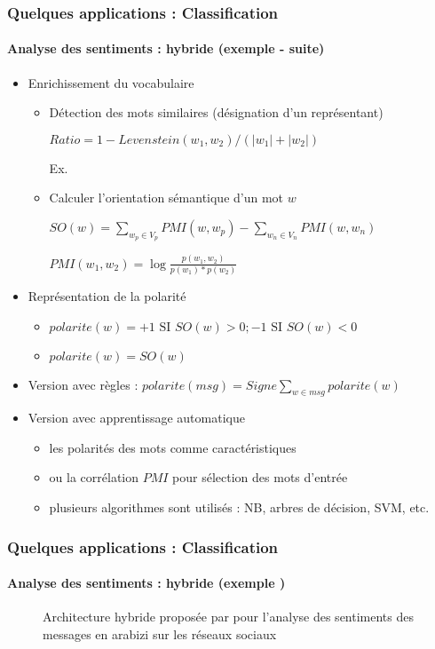 \documentclass[xcolor=table]{beamer}
\begin{document}
\begin{frame}
	\frametitle{Quelques applications : Classification}
	\framesubtitle{Analyse des sentiments : hybride (exemple \cite{18-bettiche-al} - suite) }
	
	\begin{itemize}
		\item Enrichissement du vocabulaire
		\begin{itemize}
			\item Détection des mots similaires (désignation d'un représentant)
			
			$Ratio = 1 - Levenstein(w_1, w_2)/(|w_1|+|w_2|)$
			
			Ex. 
			
			\item Calculer l'orientation sémantique d'un mot $w$
			
			
			$SO(w) = \sum_{w_p \in V_p} PMI(w, w_p) - \sum_{w_n \in V_n} PMI(w, w_n)$
			
			$PMI (w_1, w_2) = \log \frac{p(w_1, w_2)}{p(w_1)*p(w_2)}$
		\end{itemize}
		\item Représentation de la polarité
		\begin{itemize}
			\item $polarite(w) = +1 \text{ SI } SO(w) > 0; -1 \text{ SI } SO(w) < 0$
			\item $polarite(w) = SO(w)$
		\end{itemize}
		\item Version avec règles : $polarite(msg) = Signe \sum_{w \in msg} polarite(w)$
		\item Version avec apprentissage automatique
		\begin{itemize}
			\item les polarités des mots comme caractéristiques
			\item ou la corrélation $PMI$ pour sélection des mots d'entrée
			\item plusieurs algorithmes sont utilisés : NB, arbres de décision, SVM, etc.
		\end{itemize}
	\end{itemize}
	
\end{frame}

\begin{frame}
	\frametitle{Quelques applications : Classification}
	\framesubtitle{Analyse des sentiments : hybride (exemple \cite{18-guellil-al}) }
	
	\begin{figure}
		\centering
		\caption{Architecture hybride proposée par \cite{18-guellil-al} pour l'analyse des sentiments des messages en arabizi sur les réseaux sociaux}
	\end{figure}
	
\end{frame}
\end{document}
